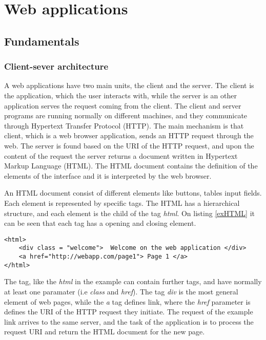 \section{Web applications}

\subsection{Fundamentals} \label{fundamentals}

\subsubsection{Client-sever architecture} \label{clientServer}

A web applications have two main units, the client and the server. The client is the application, which the user interacts with, while the server is an other application serves the request coming from the client. The client and server programs are running normally on different machines, and they communicate through Hypertext Transfer Protocol (HTTP). The main mechanism is that client, which is a web browser application, sends an HTTP request through the web. The server is found based on the URI of the HTTP request, and upon the content of the request the server returns a document written in Hypertext Markup Language (HTML). The HTML document contains the definition of the elements of the interface and it is interpreted by the web browser.



An HTML document consist of different elements like buttons, tables input fields. Each element is represented by specific tags. The HTML has a hierarchical structure, and each element is the child of the tag \textit{html}. On listing \ref{exHTML} it can be seen that each tag has a opening and closing element. 

\begin{lstlisting}[captionpos=b, caption=Example HTML document, label=exHTML, belowskip=1em, aboveskip=2em,
basicstyle=\footnotesize,frame=single]
<html>
	<div class = "welcome">  Welcome on the web application </div>
	<a href="http://webapp.com/page1"> Page 1 </a>
</html>
\end{lstlisting}

The tag, like the \textit{html} in the example can contain further tags, and have normally at least one paramater (i.e \textit{class} and \textit{href}). The tag \textit{div} is the most general element of web pages, while the \textit{a} tag defines link, where the \textit{href} parameter is defines the URI of the HTTP request they initiate. The request of the example link arrives to the same server, and the task of the application is to process the request URI and return the HTML document for the new page. 


